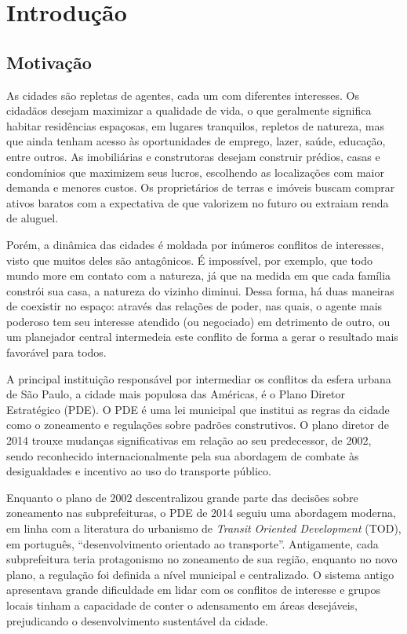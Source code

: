 \chapter{Introdução}

\section{Motivação}
\label{sec:motivacao}

As cidades são repletas de agentes, cada um com diferentes interesses. Os cidadãos desejam maximizar a qualidade de vida, o que geralmente significa habitar residências espaçosas, em lugares tranquilos, repletos de natureza, mas que ainda tenham acesso às oportunidades de emprego, lazer, saúde, educação, entre outros. As imobiliárias e construtoras desejam construir prédios, casas e condomínios que maximizem seus lucros, escolhendo as localizações com maior demanda e menores custos. Os proprietários de terras e imóveis buscam comprar ativos baratos com a expectativa de que valorizem no futuro ou extraiam renda de aluguel. 

Porém, a dinâmica das cidades é moldada por inúmeros conflitos de interesses, visto que muitos deles são antagônicos. É impossível, por exemplo, que todo mundo more em contato com a natureza, já que na medida em que cada família constrói sua casa, a natureza do vizinho diminui. Dessa forma, há duas maneiras de coexistir no espaço: através das relações de poder, nas quais, o agente mais poderoso tem seu interesse atendido (ou negociado) em detrimento de outro, ou um planejador central intermedeia este conflito de forma a gerar o resultado mais favorável para todos.

A principal instituição responsável por intermediar os conflitos da esfera urbana de São Paulo, a cidade mais populosa das Américas, é o Plano Diretor Estratégico (PDE). O PDE é uma lei municipal que institui as regras da cidade como o zoneamento e regulações sobre padrões construtivos. O plano diretor de 2014 trouxe mudanças significativas em relação ao seu predecessor, de 2002, sendo reconhecido internacionalmente pela sua abordagem de combate às desigualdades e incentivo ao uso do transporte público.

Enquanto o plano de 2002 descentralizou grande parte das decisões sobre zoneamento nas subprefeituras, o PDE de 2014 seguiu uma abordagem moderna, em linha com a literatura do urbanismo de \textit{Transit Oriented Development} (TOD), em português, ``desenvolvimento orientado ao transporte''. Antigamente, cada subprefeitura teria protagonismo no zoneamento de sua região, enquanto no novo plano, a regulação foi definida a nível municipal e centralizado. O sistema antigo apresentava grande dificuldade em lidar com os conflitos de interesse e grupos locais tinham a capacidade de conter o adensamento em áreas desejáveis, prejudicando o desenvolvimento sustentável da cidade.

